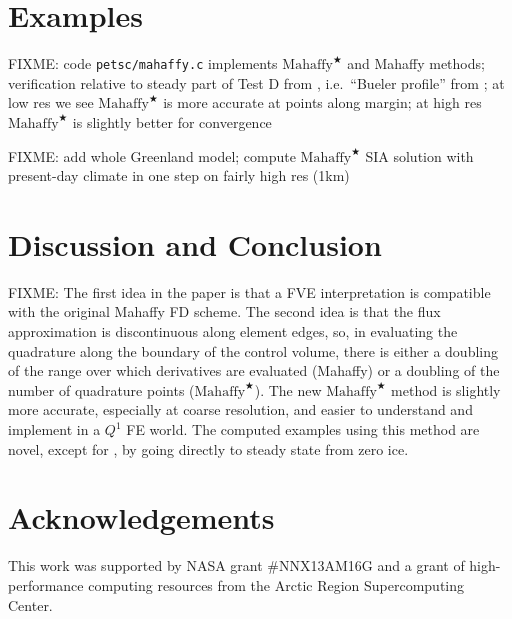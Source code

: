 \documentclass[twocolumn,letterpaper]{igs}
\newcommand{\Mstar}{$\text{Mahaffy}^{\bigstar}$\xspace}
\begin{document}
\section{Examples} \label{sec:examples}

FIXME: code \texttt{petsc/mahaffy.c} implements \Mstar and Mahaffy methods; verification relative to steady part of Test D from \cite{Bueleretal2005}, i.e.~``Bueler profile'' from \cite{vanderVeen2013}; at low res we see \Mstar is more accurate at points along margin; at high res \Mstar is slightly better for convergence

FIXME: add whole Greenland model; compute \Mstar SIA solution with present-day climate in one step on fairly high res (1km)


\section{Discussion and Conclusion} \label{sec:conclusion}

FIXME: The first idea in the paper is that a FVE interpretation is compatible with the original Mahaffy FD scheme.  The second idea is that the flux approximation is discontinuous along element edges, so, in evaluating the quadrature along the boundary of the control volume, there is either a doubling of the range over which derivatives are evaluated (Mahaffy) or a doubling of the number of quadrature points (\Mstar).  The new \Mstar method is slightly more accurate, especially at coarse resolution, and easier to understand and implement in a $Q^1$ FE world.  The computed examples using this method are novel, except for \cite{JouvetBueler2012}, by going directly to steady state from zero ice.

\section*{Acknowledgements}
This work was supported by NASA grant \#NNX13AM16G and a grant of high-performance computing resources from the Arctic Region Supercomputing Center.






\begin{comment}
Here is what the MPAS Land-Ice User's Manual version 3.0 says:

\begin{quote}
\small
Velocities and fluxes are calculated on the midpoint of Voronoi cell edges.  The normal component of surface slope is calculated on cell edges using surface elevation at adjacent cell centers.  The tangential component of surface slope is calculated on cell edges using surface elevation at adjacent vertices. The surface elevation at vertices is calculated from the values at adjacent cell centers using barycentric interpolation. Ice thickness on edges is calculated as the average of the adjacent cell center values (2nd-order approximation).
\end{quote}

Looking at this, and the code, I don't think they think of it as Petrov-Galerkin
\end{comment}
\end{document}
